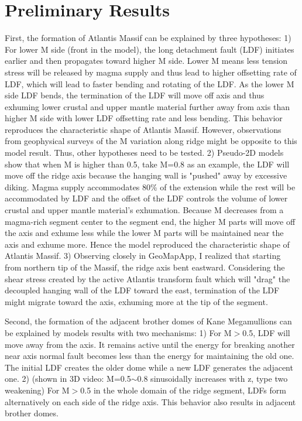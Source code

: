 \documentclass[12pt]{article}
\begin{document}
\break
\section{Preliminary Results}
First, the formation of Atlantis Massif can be explained by three hypotheses: 
1) For lower M side (front in the model), the long detachment fault (LDF) initiates earlier and then propagates toward higher M side. Lower M means less tension stress will be released by magma supply and thus lead to higher offsetting rate of LDF, which will lead to faster bending and rotating of the LDF. As the lower M side LDF bends, the termination of the LDF will move off axis and thus exhuming lower crustal and upper mantle material further away from axis than higher M side with lower LDF offsetting rate and less bending. This behavior reproduces the characteristic shape of Atlantis Massif. However, observations from geophysical surveys of the M variation along ridge might be opposite to this model result. Thus, other hypotheses need to be tested.
2) Pseudo-2D models show that when M is higher than 0.5, take M=0.8 as an example, the LDF will move off the ridge axis because the hanging wall is "pushed" away by excessive diking. Magma supply accommodates 80\% of the extension while the rest will be accommodated by LDF and the offset of the LDF controls the volume of lower crustal and upper mantle material’s exhumation. Because M decreases from a magma-rich segment center to the segment end, the higher M parts will move off the axis and exhume less while the lower M parts will be maintained near the axis and exhume more. Hence the model reproduced the characteristic shape of Atlantis Massif. 
3) Observing closely in GeoMapApp, I realized that starting from northern tip of the Massif, the ridge axis bent eastward. Considering the shear stress created by the active Atlantis transform fault which will "drag" the decoupled hanging wall of the LDF toward the east, termination of the LDF might migrate toward the axis, exhuming more at the tip of the segment. 

Second, the formation of the adjacent brother domes of Kane Megamullions can be explained by models results with two mechanisms: 1) For M$>$0.5, LDF will move away from the axis. It remains active until the energy for breaking another near axis normal fault becomes less than the energy for maintaining the old one. The initial LDF creates the older dome while a new LDF generates the adjacent one. 2) (shown in 3D video:
M=0.5$\sim$0.8 sinusoidally increases with z, type two weakening) For M$>$0.5 in the whole domain of the ridge segment, LDFs form alternatively on each side of the ridge axis. This behavior also results in adjacent brother domes. 
\end{document}
